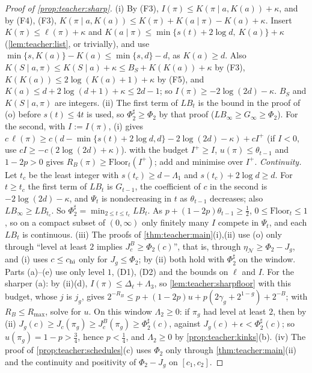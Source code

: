 \begin{proof}[Proof of \cref{prop:teacher:sharp}]
(i) By (F3), $I(\pi)\le K(\pi\mid a,K(a))+\kappa$, and by (F4), (F3), $K(\pi\mid a,K(a))\le K(\pi)+K(a\mid\pi)-K(a)+\kappa$. Insert $K(\pi)\le\ell(\pi)+\kappa$ and $K(a\mid\pi)\le\min\{s(t)+2\log d,\ K(a)\}+\kappa$ (\cref{lem:teacher:list}, or trivially), and use $\min\{s,K(a)\}-K(a)\le\min\{s,d\}-d$, as $K(a)\ge d$. Also $K(S\mid a,\pi)\le K(S\mid a)+\kappa\le B_S+K(K(a))+\kappa$ by (F3), $K(K(a))\le2\log(K(a)+1)+\kappa$ by (F5), and $K(a)\le d+2\log(d+1)+\kappa\le2d-1$; so $I(\pi)\ge-2\log(2d)-\kappa$. $B_S$ and $K(S\mid a,\pi)$ are integers.
(ii) The first term of $LB_t$ is the bound in the proof of (o) before $s(t)\le4t$ is used, so $\Phi_2^\sharp\ge\Phi_2$ by that proof ($LB_\infty\ge G_\infty\ge\Phi_2$). For the second, with $I:=I(\pi)$, (i) gives $c\,\ell(\pi)\ge c(d-\min\{s(t)+2\log d,d\}-2\log(2d)-\kappa)+cI^+$ (if $I<0$, use $cI\ge-c(2\log(2d)+\kappa)$).  with the budget $I^+\ge I$, $u(\pi)\le\theta_{t-1}$ and $1-2p>0$ gives $R_B(\pi)\ge\mathrm{Floor}_t(I^+)$; add and minimise over $I^+$.
\emph{Continuity.} Let $t_c$ be the least integer with $s(t_c)\ge d-\Lambda_1$ and $s(t_c)+2\log d\ge d$. For $t\ge t_c$ the first term of $LB_t$ is $G_{t-1}$, the coefficient of $c$ in the second is $-2\log(2d)-\kappa$, and $\Psi_t$ is nondecreasing in $t$ as $\theta_{t-1}$ decreases; also $LB_\infty\ge LB_{t_c}$. So $\Phi_2^\sharp=\min_{2\le t\le t_c}LB_t$. As $p+(1-2p)\theta_{t-1}\ge\frac12$, $0\le\mathrm{Floor}_t\le1$, so on a compact subset of $(0,\infty)$ only finitely many $I$ compete in $\Psi_t$, and each $LB_t$ is continuous.
(iii) The proofs of \cref{thm:teacher:main}(i),(ii) use (o) only through ``level at least $2$ implies $J^B_c\ge\Phi_2(c)$'', that is, through $\eta_{\mathcal N}\ge\Phi_2-J_g$, and (i) uses $c\le c_{\rm hi}$ only for $J_g\le\Phi_2$; by (ii) both hold with $\Phi_2^\sharp$ on the window. Parts (a)--(e) use only level $1$, (D1), (D2) and the bounds on $\ell$ and $I$. For the sharper (a): by (ii)(d), $I(\pi)\le\Delta_\ell+\Lambda_3$, so \cref{lem:teacher:sharpfloor} with this budget, whose $j$ is $j_g$, gives $2^{-R_B}\le p+(1-2p)u+p(2\gamma_g+2^{1-g})+2^{-B}$; with $R_B\le R_{\max}$, solve for $u$. On this window $\Lambda_2\ge0$: if $\pi_g$ had level at least $2$, then by (ii) $J_g(c)\ge J_c(\pi_g)\ge J^B_c(\pi_g)\ge\Phi_2^\sharp(c)$, against $J_g(c)+\epsilon<\Phi_2^\sharp(c)$; so $u(\pi_g)=1-p>\frac34$, hence $p<\frac14$, and $\Lambda_2\ge0$ by \cref{prop:teacher:kinks}(b).
(iv) The proof of \cref{prop:teacher:schedules}(c) uses $\Phi_2$ only through \cref{thm:teacher:main}(ii) and the continuity and positivity of $\Phi_2-J_g$ on $[c_1,c_2]$.
\end{proof}

